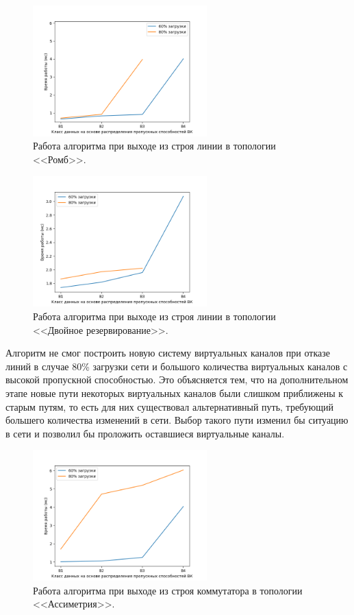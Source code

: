 \documentclass[12pt, a4paper]{article}
\begin{document}
\begin{figure}[h!]
	\centering
	\includegraphics[width=0.60\textwidth]{img/4node_res.png}
	\caption{Работа алгоритма при выходе из строя линии в топологии <<Ромб>>.}
	\label{pic:4node_res}
\end{figure}

\begin{figure}[h!]
	\centering
	\includegraphics[width=0.60\textwidth]{img/double_res.png}
	\caption{Работа алгоритма при выходе из строя линии в топологии <<Двойное резервирование>>.}
	\label{pic:double_res}
\end{figure}


Алгоритм не смог построить новую систему виртуальных каналов при отказе линий в случае 80\% загрузки сети и большого количества виртуальных каналов с высокой пропускной способностью. Это объясняется тем, что на дополнительном этапе новые пути некоторых виртуальных каналов были слишком приближены к старым путям, то есть для них существовал альтернативный путь, требующий большего количества изменений в сети. Выбор такого пути изменил бы ситуацию в сети и позволил бы проложить оставшиеся виртуальные каналы.

\begin{figure}[h!]
	\centering
	\includegraphics[width=0.60\textwidth]{img/5node_res_sw.png}
	\caption{Работа алгоритма при выходе из строя коммутатора в топологии <<Ассиметрия>>.}
	\label{pic:5node_res_sw}
\end{figure}
\end{document}
